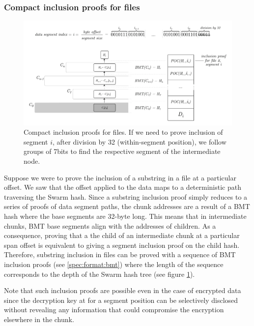 \subsubsection{Compact inclusion proofs for files}


\begin{figure}[htbp]
\centering
\includegraphics[width=\textwidth]{fig/file-inclusion.pdf}
\caption[Compact inclusion proofs for files \statusgreen]{Compact inclusion proofs for files. If we need to prove inclusion of segment   $i$, after division by 32 (within-segment position), we follow groups of 7bits to find the respective segment of the intermediate node.}
\label{fig:file-inclusion}
\end{figure}


Suppose we were to prove the inclusion of a substring in a file at a particular offset. We saw that the offset applied to the data maps to a deterministic path traversing the Swarm hash. Since a substring inclusion proof simply reduces to a series of proofs of data segment paths, the chunk addresses are a result of a BMT hash where the base segments are 32-byte long. This means that in intermediate chunks, BMT base segments align with the addresses of children. As a consequence, proving that a the child of an intermediate chunk at a particular span offset is equivalent to giving a segment inclusion proof on the child hash. Therefore, substring inclusion in files can be proved with a sequence of BMT inclusion proofs (see \ref{spec:format:bmt}) where the length of the sequence corresponds to the depth of the Swarm hash tree (see figure \ref{fig:file-inclusion}). 


Note that such inclusion proofs are possible even in the case of encrypted data since the decryption key at for a segment position can be selectively disclosed without revealing any information that could compromise the encryption elsewhere in the chunk.

